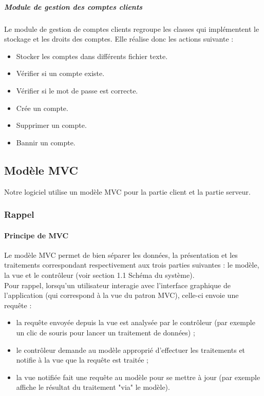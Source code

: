 \documentclass[10pt,a4paper]{report}
\begin{document}
				\subparagraph{Module de gestion des comptes clients}
				\begin{flushleft}
					Le module de gestion de comptes clients regroupe les classes qui implémentent le stockage et les droits des comptes. Elle réalise donc les actions suivante : 
					\begin{itemize}
						\item Stocker les comptes dans différents fichier texte.
						\item Vérifier si un compte existe.
						\item Vérifier si le mot de passe est correcte.
						\item Crée un compte.
						\item Supprimer un compte.
						\item Bannir un compte.
					\end{itemize}
				\end{flushleft}
				
				
	\subsection{Modèle MVC}
		Notre logiciel utilise un modèle MVC pour la partie client et la partie serveur.
		\subsubsection{Rappel}
			
			\paragraph{Principe de MVC}
			\begin{flushleft}

			Le modèle MVC permet de bien séparer les données, la présentation et les traitements correspondant respectivement aux trois parties suivantes : le modèle, la vue et le contrôleur (voir section 1.1 Schéma du système).\\
Pour rappel, lorsqu'un utilisateur interagie avec l'interface graphique de l'application (qui correspond à la vue du patron MVC), celle-ci envoie une requête  :
				\begin{itemize}
					\item la requête envoyée depuis la vue est analysée par le contrôleur (par exemple un clic de souris pour lancer un traitement de données) ;
    				\item le contrôleur demande au modèle approprié d'effectuer les traitements et notifie à la vue que la requête est traitée ;
    				\item la vue notifiée fait une requête au modèle pour se mettre à jour (par exemple affiche le résultat du traitement "via" le modèle).

				\end{itemize}
			\end{flushleft}
			
\end{document}
